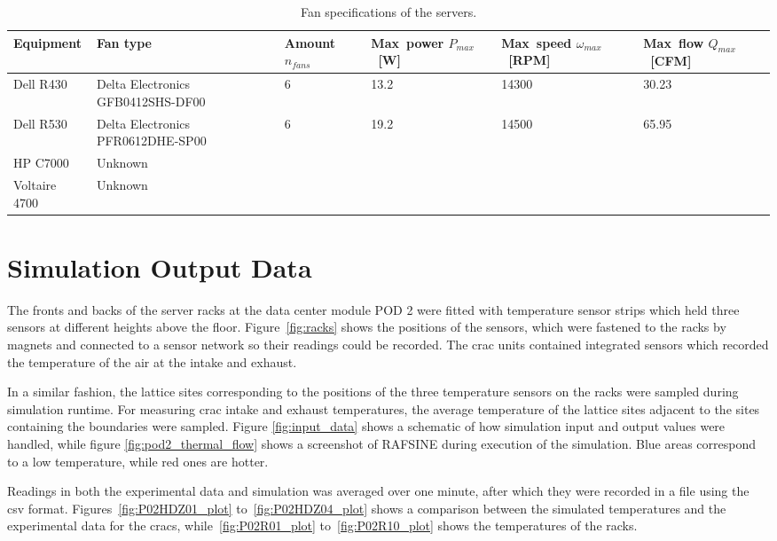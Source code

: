 \begin{table}[h]
\caption{Fan specifications of the servers.}
\begin{center}\small
    \begin{tabular}{ | m{2.2cm} | m{2.9cm} |  m{1.5cm} |  m{2.0cm} |  m{2.2cm} |  m{2.2cm} |}
    \hline
    \bfseries Equipment &  \bfseries Fan type & \bfseries Amount $n_{fans}$ & \bfseries \mbox{Max power} \mbox{$P_{max}$ [W]} & \bfseries \mbox{Max speed} \mbox{$\omega_{max}$ [RPM]} & \bfseries \mbox{Max flow}  \mbox{$Q_{max}$ [CFM]} \\ \hline
	Dell R430 & Delta Electronics GFB0412SHS-DF00 & 6 & 13.2 & 14300 & 30.23 \\ \hline
	Dell R530 & Delta Electronics PFR0612DHE-SP00 & 6 & 19.2 & 14500 & 65.95 \\ \hline
	HP C7000 & Unknown & & & &  \\ \hline
	Voltaire 4700 & Unknown & & & &  \\ \hline
    \end{tabular}
\end{center}
\label{tab:fans}
\end{table}

\section{Simulation Output Data}
The fronts and backs of the server racks at the data center module POD 2 were fitted with temperature sensor strips which held three sensors at different heights above the floor. Figure~\ref{fig:racks} shows the positions of the sensors, which were fastened to the racks by magnets and connected to a sensor network so their readings could be recorded. The \gls{crac} units contained integrated sensors which recorded the temperature of the air at the intake and exhaust.

In a similar fashion, the lattice sites corresponding to the positions of the three temperature sensors on the racks were sampled during simulation runtime. For measuring \gls{crac} intake and exhaust temperatures, the average temperature of the lattice sites adjacent to the sites containing the boundaries were sampled. Figure \ref{fig:input_data} shows a schematic of how simulation input and output values were handled, while figure \ref{fig:pod2_thermal_flow} shows a screenshot of RAFSINE during execution of the simulation. Blue areas correspond to a low temperature, while red ones are hotter.

Readings in both the experimental data and simulation was averaged over one minute, after which they were recorded in a file using the \gls{csv} format. Figures~\ref{fig:P02HDZ01_plot} to~\ref{fig:P02HDZ04_plot} shows a comparison between the simulated temperatures and the experimental data for the \gls{crac}s, while~\ref{fig:P02R01_plot} to~\ref{fig:P02R10_plot} shows the temperatures of the racks.

